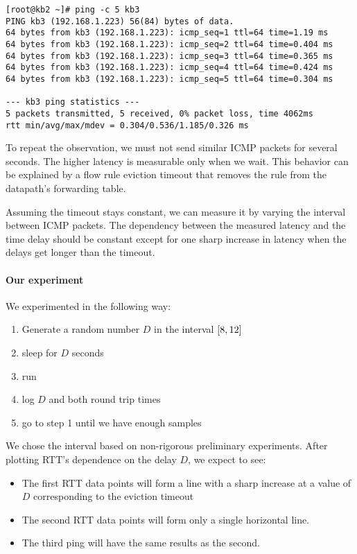 \begin{lstlisting}[caption=Output of the \ident{ping} command in the virtualized environment, captionpos=b, basicstyle=\ttfamily\scriptsize]
[root@kb2 ~]# ping -c 5 kb3
PING kb3 (192.168.1.223) 56(84) bytes of data.
64 bytes from kb3 (192.168.1.223): icmp_seq=1 ttl=64 time=1.19 ms
64 bytes from kb3 (192.168.1.223): icmp_seq=2 ttl=64 time=0.404 ms
64 bytes from kb3 (192.168.1.223): icmp_seq=3 ttl=64 time=0.365 ms
64 bytes from kb3 (192.168.1.223): icmp_seq=4 ttl=64 time=0.424 ms
64 bytes from kb3 (192.168.1.223): icmp_seq=5 ttl=64 time=0.304 ms

--- kb3 ping statistics ---
5 packets transmitted, 5 received, 0% packet loss, time 4062ms
rtt min/avg/max/mdev = 0.304/0.536/1.185/0.326 ms
\end{lstlisting}

To repeat the observation, we must not send similar ICMP packets for several seconds. The higher latency is measurable only when we wait. This behavior can be explained by a flow rule eviction timeout that removes the rule from the datapath's forwarding table.

Assuming the timeout stays constant, we can measure it by varying the interval between ICMP packets. The dependency between the measured latency and the time delay should be constant except for one sharp increase in latency when the delays get longer than the timeout.

\paragraph{Our experiment}
We experimented in the following way:

\begin{enumerate}
    \item Generate a random number $D$ in the interval $\interval{8}{12}$
    \item sleep for $D$ seconds
    \item run 
    \item log $D$ and both round trip times
    \item go to step 1 until we have enough samples
\end{enumerate}

We chose the interval based on non-rigorous preliminary experiments. After plotting RTT's dependence on the delay $D$, we expect to see:

\begin{itemize}
    \item The first RTT data points will form a line with a sharp increase at a value of $D$ corresponding to the eviction timeout

    \item The second RTT data points will form only a single horizontal line.

    \item The third ping will have the same results as the second.
\end{itemize}

